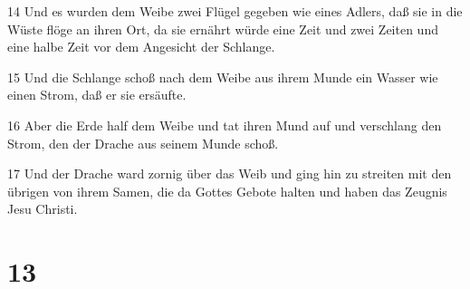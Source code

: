 \par 14 Und es wurden dem Weibe zwei Flügel gegeben wie eines Adlers, daß sie in die Wüste flöge an ihren Ort, da sie ernährt würde eine Zeit und zwei Zeiten und eine halbe Zeit vor dem Angesicht der Schlange.
\par 15 Und die Schlange schoß nach dem Weibe aus ihrem Munde ein Wasser wie einen Strom, daß er sie ersäufte.
\par 16 Aber die Erde half dem Weibe und tat ihren Mund auf und verschlang den Strom, den der Drache aus seinem Munde schoß.
\par 17 Und der Drache ward zornig über das Weib und ging hin zu streiten mit den übrigen von ihrem Samen, die da Gottes Gebote halten und haben das Zeugnis Jesu Christi.

\chapter{13}

